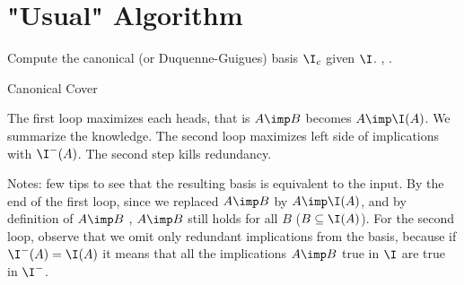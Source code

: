 \section{"Usual" Algorithm}

Compute the canonical (or Duquenne-Guigues) basis $\I_c$ given $\I$. \cite{Duq},
\cite{CExp}. 

\begin{algorithm}[H]
	

	
	\caption{Canonical Cover}	
\end{algorithm}


\vspace{1.2em}

\noindent The first loop maximizes each heads, that is $A \imp B$ becomes $A 
\imp \I(A)$. We summarize the knowledge. The second loop maximizes left side
of implications with $\I^{-}(A)$. The second step kills redundancy.

\vspace{1.2em}

\noindent Notes: few tips to see that the resulting basis is equivalent to the 
input. By the end of the first loop, since we replaced $A \imp B$ by $A \imp 
\I(A)$, and by definition of $A \imp B$ , $A \imp B$ still holds for all $B$
($B \subseteq \I(A)$). For the second loop, observe that we omit only redundant
implications from the basis, because if $\I^{-}(A) = \I(A)$ it means that all
the implications $A \imp B$ true in $\I$ are true in $\I^{-}$. 